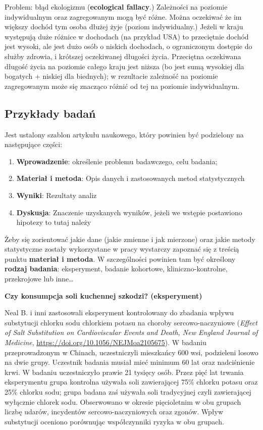 \documentclass[
  openany]{book}
\providecommand{\tightlist}{%
  \setlength{\itemsep}{0pt}\setlength{\parskip}{0pt}}
\begin{document}
Problem: błąd ekologizmu (\textbf{ecological fallacy}.) Zależności na poziomie indywidualnym oraz zagregowanym
mogą być różne. Można oczekiwać że im większy dochód tym osoba dłużej żyje (poziom indywidualny.) Jeżeli
w kraju występują duże różnice w dochodach (na przykład USA) to przeciętnie dochód jest wysoki, ale jest
dużo osób o niskich dochodach, o ograniczonym dostępie do służby zdrowia, i krótszej oczekiwanej długości życia.
Przeciętna oczekiwana długość życia na poziomie całego kraju jest niższa (bo jest sumą wysokiej
dla bogatych + niskiej dla biednych);
w rezultacie zależność na poziomie zagregowanym może się znacząco różnić
od tej na poziomie indywidualnym.

\hypertarget{przykux142ady-badaux144}{%
\subsection{Przykłady badań}\label{przykux142ady-badaux144}}

Jest ustalony szablon artykułu naukowego, który powinien być podzielony na
następujące części:

\begin{enumerate}
\def\labelenumi{\arabic{enumi}.}
\tightlist
\item
  \textbf{Wprowadzenie}: określenie problemu badawczego, celu badania;
\item
  \textbf{Materiał i metoda}: Opis danych i zastosowanych metod statystycznych
\item
  \textbf{Wyniki}: Rezultaty analiz
\item
  \textbf{Dyskusja}: Znaczenie uzyskanych wyników, jeżeli we wstępie postawiono hipotezy
  to tutaj należy
\end{enumerate}

Żeby się zorientować jakie dane (jakie zmienne i jak mierzone) oraz jakie metody statystyczne zostały
wykorzystane w pracy wystarczy zapoznać się z treścią punktu \textbf{materiał i metoda}. W szczególności
powinien tam być określony \textbf{rodzaj badania}: eksperyment, badanie kohortowe, kliniczno-kontrolne,
przekrojowe lub inne\ldots{}

\begin{example}
\textbf{Czy konsumpcja soli kuchennej szkodzi? (eksperyment)}

Neal B. i inni zastosowali eksperyment kontrolowany do zbadania
wpływu substytucji chlorku sodu chlorkiem potasu na choroby sercowo-naczyniowe
(\emph{Effect of Salt Substitution on Cardioviscular Events and Death,
New England Journal of Medicine},
\url{https://doi.org/10.1056/NEJMoa2105675}). W badaniu
przeprowadzonym w Chinach, uczestniczyli mieszkańcy 600 wsi, podzieleni
losowo na dwie grupy. Uczestnik badania musiał mieć minimum 60 lat oraz
nadciśnienie krwi. W badaniu uczestniczyło prawie 21 tysięcy osób.
Przez pięć lat trwania eksperymentu grupa kontrolna używała soli zawierającej 75\% chlorku potasu oraz 25\%
chlorku sodu; grupa badana zaś używała soli tradycyjnej czyli zawierającej
wyłącznie chlorek sodu. Obserwowano w okresie pięcioletnim w obu grupach
liczbę udarów, incydentów sercowo-naczyniowych oraz zgonów. Wpływ
substytucji oceniono porównując współczynniki ryzyka w obu grupach.
\end{example}
\end{document}
